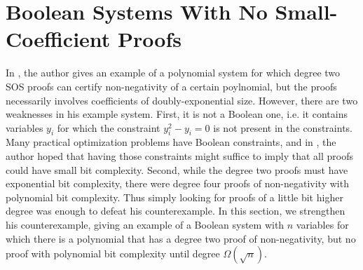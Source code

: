 \section{Boolean Systems With No Small-Coefficient Proofs}\label{sec:counterexample}
In \cite{odonnel}, the author gives an example of a polynomial system for which degree two SOS proofs can certify non-negativity of a certain poylnomial, but the proofs necessarily involves coefficients of doubly-exponential size. However, there are two weaknesses in his example system. First, it is not a Boolean one, i.e. it contains variables $y_i$ for which the constraint $y_i^2 - y_i = 0$ is not present in the constraints. Many practical optimization problems have Boolean constraints, and in \cite{odonnel}, the author hoped that having those constraints might suffice to imply that all proofs could have small bit complexity. Second, while the degree two proofs must have exponential bit complexity, there were degree four proofs of non-negativity with polynomial bit complexity. Thus simply looking for proofs of a little bit higher degree was enough to defeat his counterexample. In this section, we strengthen his counterexample, giving an example of a Boolean system with $n$ variables for which there is a polynomial that has a degree two proof of non-negativity, but no proof with polynomial bit complexity until degree $\Omega(\sqrt{n})$.

